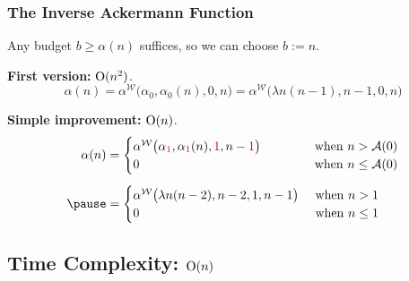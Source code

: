 \begin{frame}
\frametitle{The Inverse Ackermann Function}

Any budget $b \ge \alpha(n)$ suffices, so we can choose $b := n$.

\bigskip

\pause
\textbf{First version:} $\text{O}(n^2)$.
\pause
\begin{equation*}
\alpha(n) = \alpha^{\mathcal{W}}\big(\alpha_0, \alpha_0(n), 0, n\big)
= \alpha^{\mathcal{W}}\big(\lambda n(n - 1), n - 1, 0, n\big)
\end{equation*}

\smallskip

\pause
\textbf{Simple improvement:} $\text{O}(n)$.
\pause
\begin{equation*}
\begin{aligned}
\alpha(n) & = \begin{cases}
\alpha^{\mathcal{W}}\big(\alpha_{{\color{red} 1}}, \alpha_{{\color{red} 1}}(n), {{\color{red} 1}}, n - {{\color{red} 1}}\big) & \hspace{3em}\text{ when } n > \Ack(0) \\
0 & \hspace{3em}\text{ when } n \le \Ack(0)
\end{cases} \\[5pt]
\pause & = \begin{cases}
\alpha^{\mathcal{W}}\big(\lambda n(n - 2), n - 2, 1, n - 1\big) & \text{ when } n > 1 \\
0 & \text{ when } n \le 1
\end{cases}
\end{aligned}
\end{equation*}

\end{frame}


\subsection{Time Complexity: $\text{O}(n)$}

